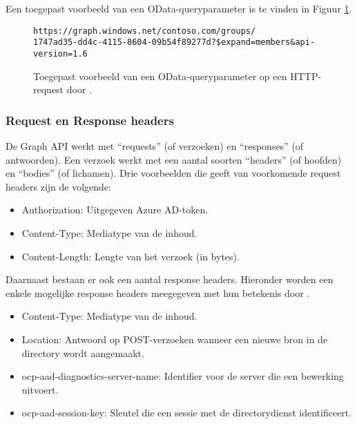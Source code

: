 Een toegepast voorbeeld van een OData-queryparameter is te vinden in Figuur \ref{odqp}. \\

\begin{figure}[h]
\scriptsize\begin{verbatim}
https://graph.windows.net/contoso.com/groups/
1747ad35-dd4c-4115-8604-09b54f89277d?$expand=members&api-version=1.6
\end{verbatim}    
\caption[Voorbeeld OData-queryparameter]{Toegepast voorbeeld van een OData-queryparameter op een \ac{HTTP}-request door \textcite{Microsoft2016b}.}
\label{odqp}
\end{figure}



\subsubsection{Request en Response headers}


De Graph \ac{API} werkt met “requests” (of verzoeken) en “responses” (of antwoorden). Een verzoek werkt met een aantal soorten “headers” (of hoofden) en “bodies” (of lichamen). Drie voorbeelden die \textcite{Microsoft2015} geeft van voorkomende request headers zijn de volgende:

\begin{itemize}
    \item Authorization: Uitgegeven Azure \ac{AD}-token.
    \item Content-Type: Mediatype van de inhoud.
    \item Content-Length: Lengte van het verzoek (in bytes).
\end{itemize} 

Daarnaast bestaan er ook een aantal response headers. Hieronder worden een enkele mogelijke response headers meegegeven met hun betekenis door \textcite{Microsoft2015}.

\begin{itemize}
    \item Content-Type: Mediatype van de inhoud.
    \item Location: Antwoord op POST-verzoeken wanneer een nieuwe bron in de directory wordt aangemaakt.
    \item ocp-aad-diagnostics-server-name: Identifier voor de server die een bewerking uitvoert.
    \item ocp-aad-session-key: Sleutel die een sessie met de directorydienst identificeert.
\end{itemize}

